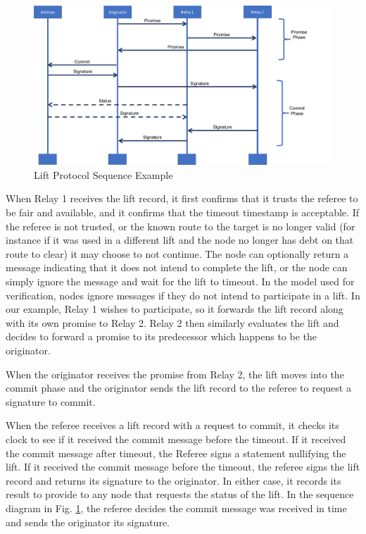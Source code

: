 \documentclass[runningheads]{llncs}
\begin{document}
\begin{figure}
    \centering
    \includegraphics[scale=0.35]{SequenceDiagramLifeline.png}
    \caption{Lift Protocol Sequence Example}
    \label{fig:liftSequence}
\end{figure}

When Relay 1 receives the lift record, it first confirms that it trusts the referee to be fair and available, and it confirms that the timeout timestamp is acceptable. If the referee is not trusted, or the known route to the target is no longer valid (for instance if it was used in a different lift and the node no longer has debt on that route to clear) it may choose to not continue. The node can optionally return a message indicating that it does not intend to complete the lift, or the node can simply ignore the message and wait for the lift to timeout. In the model used for verification, nodes ignore messages if they do not intend to participate in a lift. In our example, Relay 1 wishes to participate, so it forwards the lift record along with its own promise to Relay 2. Relay 2 then similarly evaluates the lift and decides to forward a promise to its predecessor which happens to be the originator. 

When the originator receives the promise from Relay 2, the lift moves into the commit phase and the originator sends the lift record to the referee to request a signature to commit. 

When the referee receives a lift record with a request to commit, it checks its clock to see if it received the commit message before the timeout. If it received the commit message after timeout, the Referee signs a statement nullifying the lift. If it received the commit message before the timeout, the referee signs the lift record and returns its signature to the originator. In either case, it records its result to provide to any node that requests the status of the lift. In the sequence diagram in Fig. \ref{fig:liftSequence}, the referee decides the commit message was received in time and sends the originator its signature.
\end{document}
